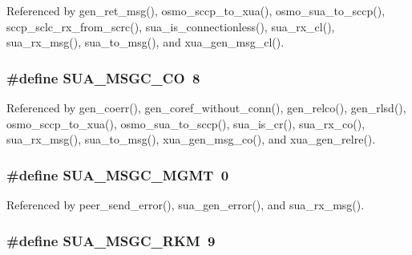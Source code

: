 Referenced by gen\+\_\+ret\+\_\+msg(), osmo\+\_\+sccp\+\_\+to\+\_\+xua(), osmo\+\_\+sua\+\_\+to\+\_\+sccp(), sccp\+\_\+sclc\+\_\+rx\+\_\+from\+\_\+scrc(), sua\+\_\+is\+\_\+connectionless(), sua\+\_\+rx\+\_\+cl(), sua\+\_\+rx\+\_\+msg(), sua\+\_\+to\+\_\+msg(), and xua\+\_\+gen\+\_\+msg\+\_\+cl().

\subsubsection[{S\+U\+A\+\_\+\+M\+S\+G\+C\+\_\+\+CO}]{\setlength{\rightskip}{0pt plus 5cm}\#define S\+U\+A\+\_\+\+M\+S\+G\+C\+\_\+\+CO~8}\label{sua_8h_a61a425e38129067a2a1ff88b5154abbf}


Referenced by gen\+\_\+coerr(), gen\+\_\+coref\+\_\+without\+\_\+conn(), gen\+\_\+relco(), gen\+\_\+rlsd(), osmo\+\_\+sccp\+\_\+to\+\_\+xua(), osmo\+\_\+sua\+\_\+to\+\_\+sccp(), sua\+\_\+is\+\_\+cr(), sua\+\_\+rx\+\_\+co(), sua\+\_\+rx\+\_\+msg(), sua\+\_\+to\+\_\+msg(), xua\+\_\+gen\+\_\+msg\+\_\+co(), and xua\+\_\+gen\+\_\+relre().

\subsubsection[{S\+U\+A\+\_\+\+M\+S\+G\+C\+\_\+\+M\+G\+MT}]{\setlength{\rightskip}{0pt plus 5cm}\#define S\+U\+A\+\_\+\+M\+S\+G\+C\+\_\+\+M\+G\+MT~0}\label{sua_8h_a817ec9956260238c63ef89c01eb2959e}


Referenced by peer\+\_\+send\+\_\+error(), sua\+\_\+gen\+\_\+error(), and sua\+\_\+rx\+\_\+msg().

\subsubsection[{S\+U\+A\+\_\+\+M\+S\+G\+C\+\_\+\+R\+KM}]{\setlength{\rightskip}{0pt plus 5cm}\#define S\+U\+A\+\_\+\+M\+S\+G\+C\+\_\+\+R\+KM~9}\label{sua_8h_a41976bc2573bed3590a10088ba73d5fd}


